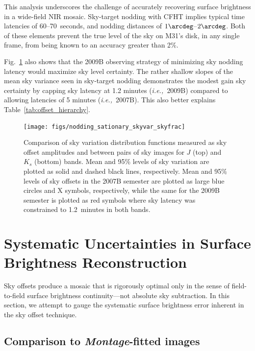 \documentclass[iop]{emulateapj}
\newcommand{\ie}{\textit{i.e.,~}}
\newcommand{\sw}[1]{\textit{#1}} %
\newcommand{\mycomment}[1]{\textcolor{OliveGreen}{\textit{#1}}} %
\newcommand{\Fig}[1]{Fig.~\ref{fig:#1}}  %
\newcommand{\Tab}[1]{Table~\ref{tab:#1}}  %
\begin{document}

This analysis underscores the challenge of accurately recovering surface brightness in a wide-field NIR mosaic.
Sky-target nodding with CFHT implies typical time latencies of 60--70~seconds, and nodding distances of $1\arcdeg$--$2\arcdeg$.
Both of these elements prevent the true level of the sky on M31's disk, in any single frame, from being known to an accuracy greater than 2\%.

\Fig{nodding_stationary_skyvar_skyfrac} also shows that the 2009B observing strategy of minimizing sky nodding latency would maximize sky level certainty.
The rather shallow slopes of the mean sky variance seen in sky-target nodding demonstrates the modest gain sky certainty by capping sky latency at 1.2 minutes (\ie 2009B) compared to allowing latencies of 5 minutes (\ie 2007B).
This also better explains \Tab{offset_hierarchy}.

\begin{figure}[t]
\centering
\texttt{[image: figs/nodding\_sationary\_skyvar\_skyfrac]}
\caption{Comparison of sky variation distribution functions measured as sky offset amplitudes and between pairs of sky images for $J$ (top) and $K_s$ (bottom) bands.
Mean and 95\% levels of sky variation are plotted as solid and dashed black lines, respectively.
Mean and 95\% levels of sky offsets in the 2007B semester are plotted as large blue circles and X symbols, respectively, while the same for the 2009B semester is plotted as red symbols where sky latency was constrained to 1.2~minutes in both bands.}
\label{fig:nodding_stationary_skyvar_skyfrac}
\end{figure}


\section{Systematic Uncertainties in Surface Brightness Reconstruction}
\label{sec:systematics}

Sky offsets produce a mosaic that is rigorously optimal only in the sense of field-to-field surface brightness continuity---not absolute sky subtraction. In this section, we attempt to gauge the systematic surface brightness error inherent in the sky offset technique.


\subsection{Comparison to \sw{Montage}-fitted images}
\end{document}
